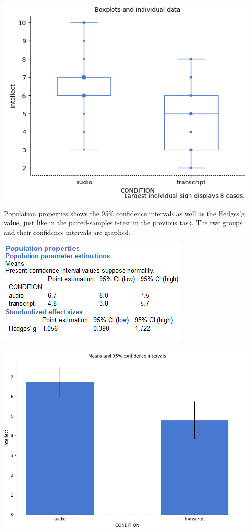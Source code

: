 \documentclass[
]{book}
\begin{document}
\includegraphics{img/ch7/7.3comparegroups_boxplot.png}

Population properties shows the 95\% confidence intervals as well as the Hedges'g value, just like in the paired-samples t-test in the previous task. The two groups and their confidence intervals are graphed.

\includegraphics{img/ch7/7.3comparegroups_CI.png}

\includegraphics{img/ch7/7.3comparegroups_CIplot.png}
\end{document}

